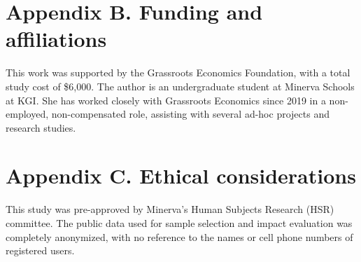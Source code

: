 \documentclass[12pt]{article}
\begin{document}
\section*{Appendix B. Funding and affiliations}
\label{sec:appendixb}
This work was supported by the Grassroots Economics Foundation, with a total study cost of \$6,000. The author is an undergraduate student at Minerva Schools at KGI. She has worked closely with Grassroots Economics since 2019 in a non-employed, non-compensated role, assisting with several ad-hoc projects and research studies.


\section*{Appendix C. Ethical considerations}
\label{sec:appendixc}
This study was pre-approved by Minerva’s Human Subjects Research (HSR) committee. The public data used for sample selection and impact evaluation was completely anonymized, with no reference to the names or cell phone numbers of registered users.
\end{document}
